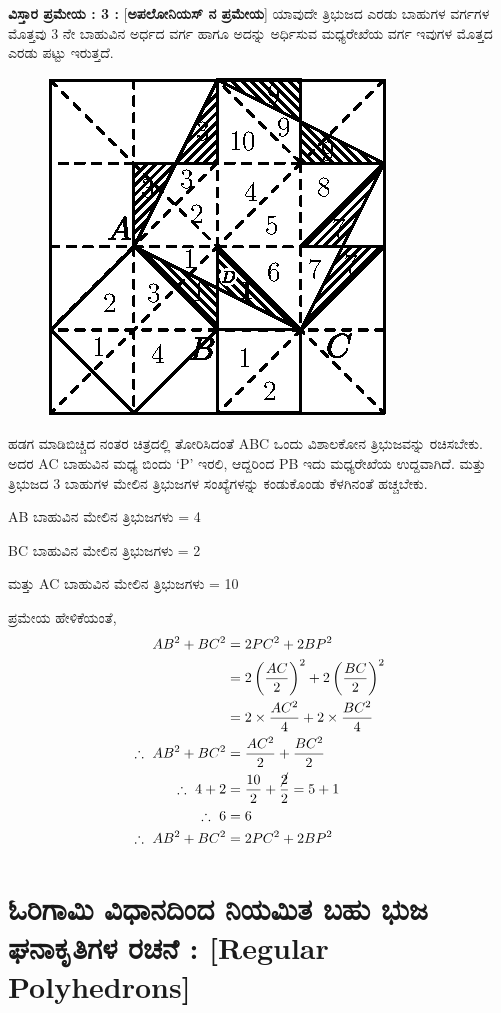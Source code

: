 \medskip
\noindent
\textbf{ವಿಸ್ತಾರ ಪ್ರಮೇಯ : 3 :} [\textbf{ಅಪಲೋನಿಯಸ್ ನ ಪ್ರಮೇಯ}]
ಯಾವುದೇ ತ್ರಿಭುಜದ ಎರಡು ಬಾಹುಗಳ ವರ್ಗಗಳ ಮೊತ್ತವು 3 ನೇ ಬಾಹುವಿನ ಅರ್ಧದ ವರ್ಗ ಹಾಗೂ ಅದನ್ನು ಅರ್ಧಿಸುವ ಮಧ್ಯರೇಖೆಯ ವರ್ಗ ಇವುಗಳ ಮೊತ್ತದ ಎರಡು ಪಟ್ಟು ಇರುತ್ತದೆ. 
\begin{figure}[H]
\centering
\includegraphics[scale=.98]{src/figure/chap1/fig1-17h.eps}
\end{figure}

ಹಡಗ ಮಾಡಿಬಿಚ್ಚಿದ ನಂತರ ಚಿತ್ರದಲ್ಲಿ ತೋರಿಸಿದಂತೆ ABC ಒಂದು ವಿಶಾಲಕೋನ  ತ್ರಿಭುಜವನ್ನು ರಚಿಸಬೇಕು. ಅದರ AC ಬಾಹುವಿನ ಮಧ್ಯ ಬಿಂದು  `P' ಇರಲಿ, ಆದ್ದರಿಂದ  PB ಇದು ಮಧ್ಯರೇಖೆಯ ಉದ್ದವಾಗಿದೆ. ಮತ್ತು ತ್ರಿಭುಜದ 3 ಬಾಹುಗಳ ಮೇಲಿನ ತ್ರಿಭುಜಗಳ ಸಂಖ್ಯೆಗಳನ್ನು ಕಂಡುಕೊಂಡು ಕೆಳಗಿನಂತೆ ಹಚ್ಚಬೇಕು. 

AB ಬಾಹುವಿನ ಮೇಲಿನ ತ್ರಿಭುಜಗಳು = 4

BC ಬಾಹುವಿನ ಮೇಲಿನ ತ್ರಿಭುಜಗಳು = 2

ಮತ್ತು AC ಬಾಹುವಿನ ಮೇಲಿನ ತ್ರಿಭುಜಗಳು = 10

ಪ್ರಮೇಯ ಹೇಳಿಕೆಯಂತೆ, 
\begin{align*}
AB^2 + BC^2 & = 2 PC^2 + 2 B P^2\\
& = 2 \left(\frac{AC}{2} \right)^2 + 2 \left(\frac{BC}{2} \right)^2\\
& = 2 \times \frac{AC^2}{4} + 2 \times \frac{BC^2}{4}\\
\therefore ~ AB^2 + BC^2 & = \frac{AC^2}{2} + \frac{BC^2}{2}\\
\therefore ~ 4+ 2 & = \frac{10}{2} + \frac{\cancel{2}}{2} = 5+1\\
\therefore ~ 6 & = 6 \\
\therefore ~ AB^2 + BC^2 & = 2 PC^2 + 2 BP^2 
\end{align*}

\section*{ಓರಿಗಾಮಿ ವಿಧಾನದಿಂದ  ನಿಯಮಿತ ಬಹು ಭುಜ ಘನಾಕೃತಿಗಳ ರಚನೆ : [Regular Polyhedrons]}

